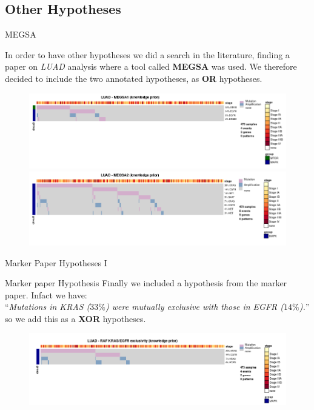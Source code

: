\documentclass{beamer}
\begin{document}
\subsection{Other Hypotheses}
\begin{frame}{MEGSA}
  \begin{block}{}
    In order to have other hypotheses we did a search in the literature, finding
    a paper \cite{megsaluad} on \textit{LUAD} analysis where a tool called
    \textbf{MEGSA} \cite{megsa} was used. We therefore decided to include the
    two annotated hypotheses, as \textbf{OR} hypotheses.  
  \end{block}
  \begin{figure}
    \centering
    \includegraphics[scale = 0.3]{img/megsa1.png}
    \includegraphics[scale = 0.3]{img/megsa2.png}  
  \end{figure}
\end{frame}
\begin{frame}{Marker Paper Hypotheses I}
  \begin{block}{Marker paper Hypothesis}
    Finally we included a hypothesis from the marker paper. Infact we have:\\
    ``\textit{Mutations in KRAS ($33\%$) were mutually exclusive with those in
      EGFR ($14\%$).}'' so we add this as a \textbf{XOR} hypotheses.
  \end{block}
  \begin{figure}
    \centering
    \includegraphics[scale = 0.4]{img/oncoprior.png}  
  \end{figure}
\end{frame}
\end{document}
